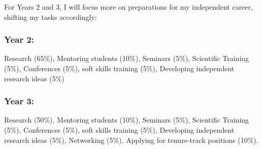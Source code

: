 \documentclass{F32}
\begin{document}
For Years 2 and 3, I will focus more on preparations for my independent career, shifting my tasks accordingly:

\subsubsection*{Year 2:}
Research (65\%), Mentoring students (10\%), Seminars (5\%), Scientific Training (5\%), Conferences (5\%), soft skills training (5\%), Developing independent research ideas (5\%)

\subsubsection*{Year 3:}
Research (50\%), Mentoring students (10\%), Seminars (5\%), Scientific Training (5\%), Conferences (5\%), soft skills training (5\%), Developing independent research ideas (5\%), Networking (5\%), Applying for tenure-track positions (10\%).
\end{document}
